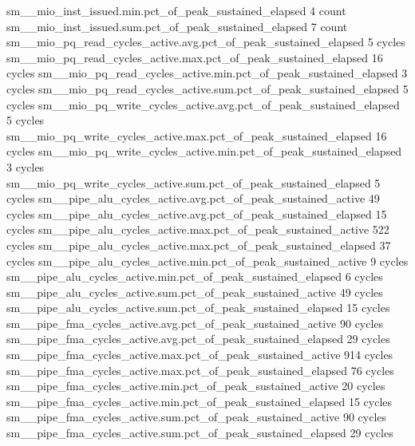sm__mio_inst_issued.min.pct_of_peak_sustained_elapsed                                          4 count
sm__mio_inst_issued.sum.pct_of_peak_sustained_elapsed                                          7 count
sm__mio_pq_read_cycles_active.avg.pct_of_peak_sustained_elapsed                                5 cycles
sm__mio_pq_read_cycles_active.max.pct_of_peak_sustained_elapsed                               16 cycles
sm__mio_pq_read_cycles_active.min.pct_of_peak_sustained_elapsed                                3 cycles
sm__mio_pq_read_cycles_active.sum.pct_of_peak_sustained_elapsed                                5 cycles
sm__mio_pq_write_cycles_active.avg.pct_of_peak_sustained_elapsed                               5 cycles
sm__mio_pq_write_cycles_active.max.pct_of_peak_sustained_elapsed                              16 cycles
sm__mio_pq_write_cycles_active.min.pct_of_peak_sustained_elapsed                               3 cycles
sm__mio_pq_write_cycles_active.sum.pct_of_peak_sustained_elapsed                               5 cycles
sm__pipe_alu_cycles_active.avg.pct_of_peak_sustained_active                                   49 cycles
sm__pipe_alu_cycles_active.avg.pct_of_peak_sustained_elapsed                                  15 cycles
sm__pipe_alu_cycles_active.max.pct_of_peak_sustained_active                                  522 cycles
sm__pipe_alu_cycles_active.max.pct_of_peak_sustained_elapsed                                  37 cycles
sm__pipe_alu_cycles_active.min.pct_of_peak_sustained_active                                    9 cycles
sm__pipe_alu_cycles_active.min.pct_of_peak_sustained_elapsed                                   6 cycles
sm__pipe_alu_cycles_active.sum.pct_of_peak_sustained_active                                   49 cycles
sm__pipe_alu_cycles_active.sum.pct_of_peak_sustained_elapsed                                  15 cycles
sm__pipe_fma_cycles_active.avg.pct_of_peak_sustained_active                                   90 cycles
sm__pipe_fma_cycles_active.avg.pct_of_peak_sustained_elapsed                                  29 cycles
sm__pipe_fma_cycles_active.max.pct_of_peak_sustained_active                                  914 cycles
sm__pipe_fma_cycles_active.max.pct_of_peak_sustained_elapsed                                  76 cycles
sm__pipe_fma_cycles_active.min.pct_of_peak_sustained_active                                   20 cycles
sm__pipe_fma_cycles_active.min.pct_of_peak_sustained_elapsed                                  15 cycles
sm__pipe_fma_cycles_active.sum.pct_of_peak_sustained_active                                   90 cycles
sm__pipe_fma_cycles_active.sum.pct_of_peak_sustained_elapsed                                  29 cycles
